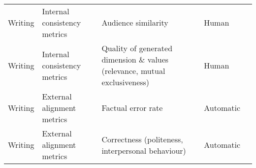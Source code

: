 \begin{small}
\begin{center}
\begin{longtable}{@{}p{}p{}p{}p{}p{}@{}}
Writing                  & Internal consistency metrics        & Audience similarity                                                                                                                                                                                         & Human     & \cite{choi2024proxona}                                                                                                                                                                                                                                                                                                                                                                                                          \\
Writing                  & Internal consistency metrics        & Quality of generated dimension \& values (relevance, mutual exclusiveness)                                                                                                                                  & Human     & \cite{choi2024proxona}                                                                                                                                                                                                                                                                                                                                                                                                          \\
Writing                  & External alignment metrics          & Factual error rate                                                                                                                                                                                          & Automatic & \cite{wang-etal-2024-unleashing}                                                                         \\
Writing                  & External alignment metrics          & Correctness (politeness, interpersonal behaviour)                                                                                                                                                           & Automatic & \cite{mishra-etal-2023-e}                                                                                                                                                                                                                                                                                                                                                                                      \\

\end{longtable}
\end{center}
\end{small}

